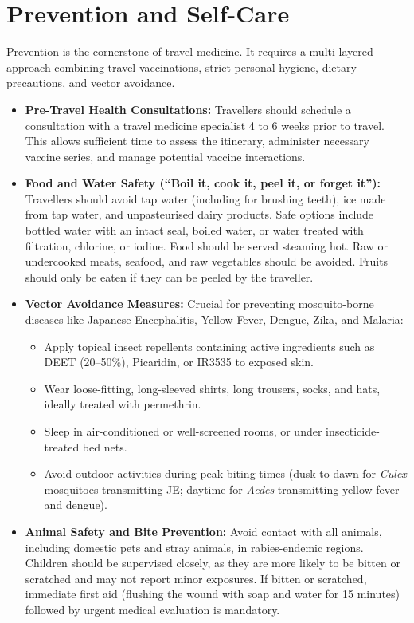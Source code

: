 \section*{Prevention and Self-Care}
Prevention is the cornerstone of travel medicine. It requires a multi-layered approach combining travel vaccinations, strict personal hygiene, dietary precautions, and vector avoidance.
\begin{itemize}
    \item \textbf{Pre-Travel Health Consultations:} Travellers should schedule a consultation with a travel medicine specialist 4 to 6 weeks prior to travel. This allows sufficient time to assess the itinerary, administer necessary vaccine series, and manage potential vaccine interactions.
    \item \textbf{Food and Water Safety (``Boil it, cook it, peel it, or forget it''):} Travellers should avoid tap water (including for brushing teeth), ice made from tap water, and unpasteurised dairy products. Safe options include bottled water with an intact seal, boiled water, or water treated with filtration, chlorine, or iodine. Food should be served steaming hot. Raw or undercooked meats, seafood, and raw vegetables should be avoided. Fruits should only be eaten if they can be peeled by the traveller.
    \item \textbf{Vector Avoidance Measures:} Crucial for preventing mosquito-borne diseases like Japanese Encephalitis, Yellow Fever, Dengue, Zika, and Malaria:
    \begin{itemize}
        \item Apply topical insect repellents containing active ingredients such as DEET (20--50\%), Picaridin, or IR3535 to exposed skin.
        \item Wear loose-fitting, long-sleeved shirts, long trousers, socks, and hats, ideally treated with permethrin.
        \item Sleep in air-conditioned or well-screened rooms, or under insecticide-treated bed nets.
        \item Avoid outdoor activities during peak biting times (dusk to dawn for \textit{Culex} mosquitoes transmitting JE; daytime for \textit{Aedes} transmitting yellow fever and dengue).
    \end{itemize}
    \item \textbf{Animal Safety and Bite Prevention:} Avoid contact with all animals, including domestic pets and stray animals, in rabies-endemic regions. Children should be supervised closely, as they are more likely to be bitten or scratched and may not report minor exposures. If bitten or scratched, immediate first aid (flushing the wound with soap and water for 15 minutes) followed by urgent medical evaluation is mandatory.

\end{itemize}
